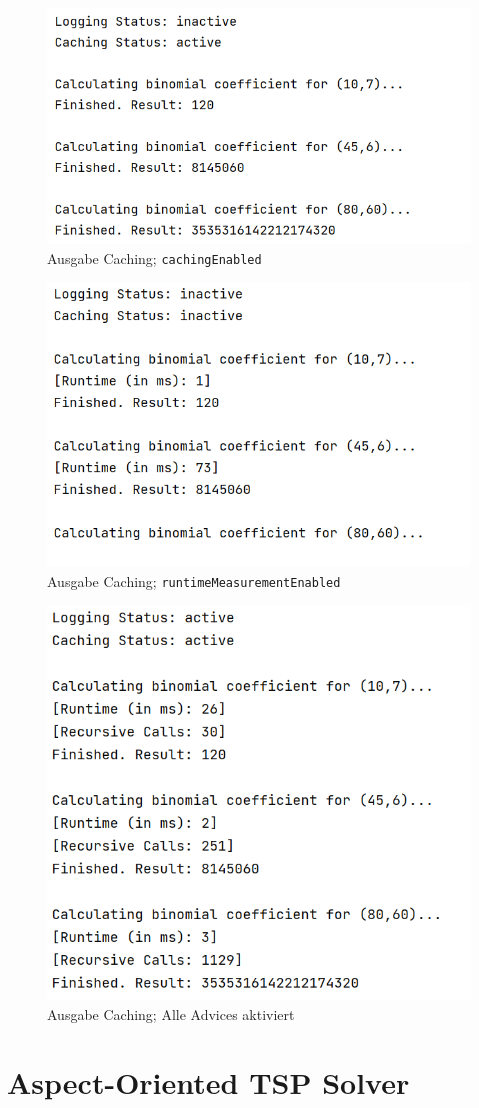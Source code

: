 \documentclass[german,notitlepage,smartquotes]{hgbreport}
\begin{document}
\begin{figure}[h]
\centering
\includegraphics[width=.5\textwidth]{caching-test-02}
\caption{Ausgabe Caching; \texttt{cachingEnabled}}
\label{caching-test-02}
\end{figure}

\begin{figure}[h]
\centering
\includegraphics[width=.5\textwidth]{caching-test-03}
\caption{Ausgabe Caching; \texttt{runtimeMeasurementEnabled}}
\label{caching-test-03}
\end{figure}

\begin{figure}[h]
\centering
\includegraphics[width=.5\textwidth]{caching-test-04}
\caption{Ausgabe Caching; Alle Advices aktiviert}
\label{caching-test-04}
\end{figure}


\clearpage

\section{Aspect-Oriented TSP Solver}
\end{document}
